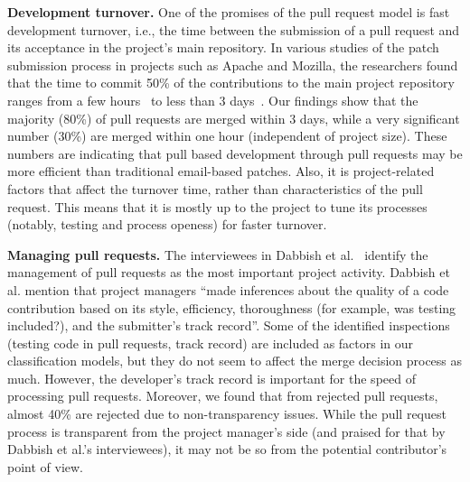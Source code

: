 \documentclass{sig-alternate}
\begin{document}
\textbf{Development turnover.} One of the promises of the pull request model is
fast development turnover, i.e., the time between the submission of a pull
request and its acceptance in the project's main repository. In various studies
of the patch submission process in projects such as Apache and Mozilla, the
researchers found that the time to commit 50\% of the contributions to the main
project repository ranges from a few hours~\cite{Rigby08} to less than 3
days~\cite{Weiss08, Baysa12}. Our findings show that the majority (80\%) of pull
requests are merged within 3 days, while a very significant number (30\%) are
merged within one hour (independent of project size). These numbers are
indicating that pull based development through pull requests may be more
efficient than traditional email-based patches.  Also, it is project-related
factors that affect the turnover time, rather than characteristics of the pull
request. This means that it is mostly up to the project to tune its processes
(notably, testing and process openess) for faster turnover.

\textbf{Managing pull requests.} The interviewees in Dabbish et
al.~\cite{Dabbi13} identify the management of pull requests as the most
important project activity. Dabbish et al. mention that project managers ``made
inferences about the quality of a code contribution based on its style,
efficiency, thoroughness (for example, was testing included?), and the
submitter's track record''. Some of the identified inspections (testing code in
pull requests, track record) are included as factors in our classification
models, but they do not seem to affect the merge decision process as much.
However, the developer's track record is important for the speed of processing
pull requests. Moreover, we found that from rejected pull requests, almost 40\%
are rejected due to non-transparency issues. While the pull request process is
transparent from the project manager's side (and praised for that by Dabbish et
al.'s interviewees), it may not be so from the potential contributor's point of
view.
\end{document}
